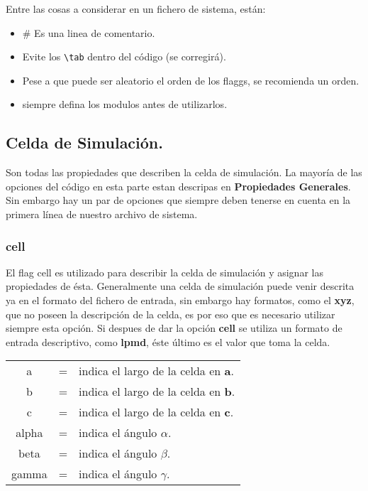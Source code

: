\documentclass[a4paper,10pt]{scrbook}
\begin{document}
Entre las cosas a considerar en un fichero de sistema, est\'an:

\begin{itemize}
 \item \# Es una linea de comentario.
 \item Evite los \verb|\tab| dentro del c\'odigo (se corregir\'a).
 \item Pese a que puede ser aleatorio el orden de los flaggs, se recomienda un orden.
 \item siempre defina los modulos antes de utilizarlos.
\end{itemize}

\subsection{Celda de Simulaci\'on.}

Son todas las propiedades que describen la celda de simulaci\'on. La mayor\'ia de las opciones del c\'odigo en esta parte estan descripas en \textbf{Propiedades Generales}. Sin embargo hay un par de opciones que siempre deben tenerse en cuenta en la primera l\'inea de nuestro archivo de sistema.

\subsubsection{cell}

El flag cell es utilizado para describir la celda de simulaci\'on y asignar las propiedades de \'esta. Generalmente una celda de simulaci\'on puede venir descrita ya en el formato del fichero de entrada, sin embargo hay formatos, como el \textbf{xyz}, que no poseen la descripci\'on de la celda, es por eso que es necesario utilizar siempre esta opci\'on. Si despues de dar la opci\'on \textbf{cell} se utiliza un formato de entrada descriptivo, como \textbf{lpmd}, \'este \'ultimo es el valor que toma la celda.

\begin{tabular}{ccl}
 a & = & indica el largo de la celda en \textbf{a}.\\
 b & = & indica el largo de la celda en \textbf{b}.\\
 c & = & indica el largo de la celda en \textbf{c}.\\
 alpha & = & indica el \'angulo $\alpha$.\\
 beta & = & indica el \'angulo $\beta$.\\
 gamma & = & indica el \'angulo $\gamma$.\\
\end{tabular}
\end{document}
